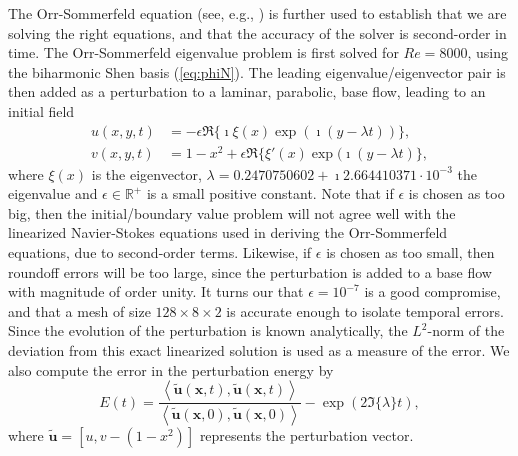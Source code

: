 \documentclass[preprint]{elsarticle}
\begin{document}
The Orr-Sommerfeld equation (see, e.g., \cite{Orszag_1971}) is further used to establish that we are solving the right equations, and that the accuracy of the solver is second-order in time. The Orr-Sommerfeld eigenvalue problem is first solved for $Re=8000$, using the biharmonic Shen basis (\ref{eq:phiN}). The leading eigenvalue/eigenvector pair is then added as a perturbation to a laminar, parabolic, base flow, leading to an initial field
\begin{align}
u(x,y,t) &= -\epsilon  \Re\{\imath \xi(x) \exp (\imath (y-\lambda t))\}, \label{eq:OS1} \\
v(x,y,t) &= 1-x^2 + \epsilon \Re\{\xi'(x) \exp(\imath(y-\lambda t)\}, \label{eq:OS2}
\end{align}
where $\xi(x)$ is the eigenvector, $\lambda=0.2470750602+\imath 2.664410371\cdot 10^{-3}$ the eigenvalue and $\epsilon \in \mathbb{R}^+$ is a small positive constant. Note that if $\epsilon$ is chosen as too big, then the initial/boundary value problem will not agree well with the linearized Navier-Stokes equations used in deriving the Orr-Sommerfeld equations, due to second-order terms. Likewise, if $\epsilon$ is chosen as too small, then roundoff errors will be too large, since the perturbation is added to a base flow with magnitude of order unity. It turns our that $\epsilon=10^{-7}$ is a good compromise, and that a mesh of size $128 \times 8 \times 2$ is accurate enough to isolate temporal errors. Since the evolution of the perturbation is known analytically, the $L^2$-norm of the deviation from this exact linearized solution is used as a measure of the error. We also compute the error in the perturbation energy by
\begin{equation}
E(t) =  \frac{\left<\tilde{\bm{u}}(\bm{x}, t), \tilde{\bm{u}}(\bm{x}, t) \right>}{\left<\tilde{\bm{u}}(\bm{x}, 0), \tilde{\bm{u}}(\bm{x}, 0) \right>}  - \exp(2 \Im\{\lambda\}t), \label{eq:OSenergy}
\end{equation}
where $\tilde{\bm{u}} = [u, v-(1-x^2)]$ represents the perturbation vector. 
\end{document}
